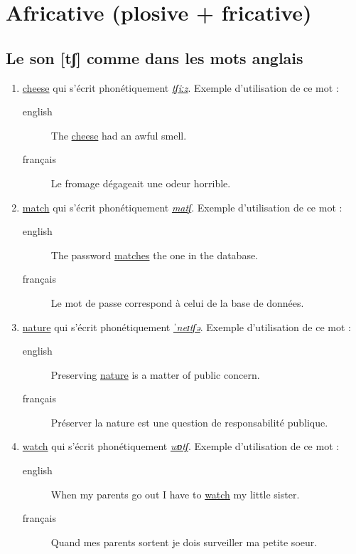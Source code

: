 \section{Africative (plosive + fricative)}
\label{sec:org54afee9}
\subsection{Le son [tʃ] comme dans les mots anglais}
\label{sec:orgd294ba3}
\begin{enumerate}
\item \href{http://www.wordreference.com/enfr/cheese}{cheese} qui s'écrit phonétiquement \href{https://en.oxforddictionaries.com/definition/cheese}{\emph{tʃiːz}}. Exemple d'utilisation de
ce mot :
\begin{description}
\item[{english}] \textenglish{The \href{https://youtu.be/xYyP9o8wXtc}{cheese} had an awful smell.}
\item[{français}] Le fromage dégageait une odeur horrible.
\end{description}
\item \href{http://www.wordreference.com/enfr/match}{match} qui s'écrit phonétiquement \href{https://en.oxforddictionaries.com/definition/match}{\emph{matʃ}}. Exemple d'utilisation de
ce mot :
\begin{description}
\item[{english}] \textenglish{The password \href{https://youtu.be/-o\_IoZdtbWs}{matches} the one in the database.}
\item[{français}] Le mot de passe correspond à celui de la base de
données.
\end{description}
\item \href{http://www.wordreference.com/enfr/nature}{nature} qui s'écrit phonétiquement \href{https://en.oxforddictionaries.com/definition/nature}{\emph{ˈneɪtʃə}}. Exemple d'utilisation
de ce mot :
\begin{description}
\item[{english}] \textenglish{Preserving \href{https://youtu.be/K\_jwPJM0QSc}{nature} is a matter of public concern.}
\item[{français}] Préserver la nature est une question de
responsabilité publique.
\end{description}
\item \href{http://www.wordreference.com/enfr/watch}{watch} qui s'écrit phonétiquement \href{https://en.oxforddictionaries.com/definition/watch}{\emph{wɒtʃ}}. Exemple d'utilisation de
ce mot :
\begin{description}
\item[{english}] \textenglish{When my parents go out I have to \href{https://youtu.be/Eya0daHX-Fw}{watch} my little
sister.}
\item[{français}] Quand mes parents sortent je dois surveiller ma
petite soeur.
\end{description}
\end{enumerate}
